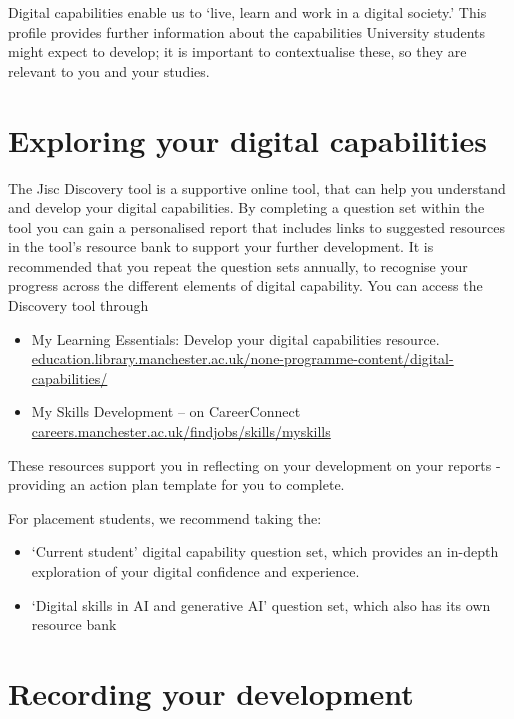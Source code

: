 \documentclass[
]{book}
\providecommand{\tightlist}{%
  \setlength{\itemsep}{0pt}\setlength{\parskip}{0pt}}
\begin{document}
Digital capabilities enable us to `live, learn and work in a digital society.' This profile provides further information about the capabilities University students might expect to develop; it is important to contextualise these, so they are relevant to you and your studies.

\section{Exploring your digital capabilities}\label{exploring-your-digital-capabilities}

The Jisc Discovery tool is a supportive online tool, that can help you understand and develop your digital capabilities. By completing a question set within the tool you can gain a personalised report that includes
links to suggested resources in the tool's resource bank to support your further development. It is recommended that you repeat the question sets annually, to recognise your progress across the different elements of digital capability. You can access the Discovery tool through

\begin{itemize}
\tightlist
\item
  My Learning Essentials: Develop your digital capabilities resource. \href{https://www.education.library.manchester.ac.uk/none-programme-content/digital-capabilities/}{education.library.manchester.ac.uk/none-programme-content/digital-capabilities/}
\item
  My Skills Development -- on CareerConnect \href{https://www.careers.manchester.ac.uk/findjobs/skills/myskills/}{careers.manchester.ac.uk/findjobs/skills/myskills}
\end{itemize}

These resources support you in reflecting on your development on your reports - providing an action plan template for you to complete.

For placement students, we recommend taking the:

\begin{itemize}
\tightlist
\item
  `Current student' digital capability question set, which provides an in-depth exploration of your digital confidence and experience.
\item
  `Digital skills in AI and generative AI' question set, which also has its own resource bank
\end{itemize}

\section{Recording your development}\label{recording-your-development}
\end{document}
